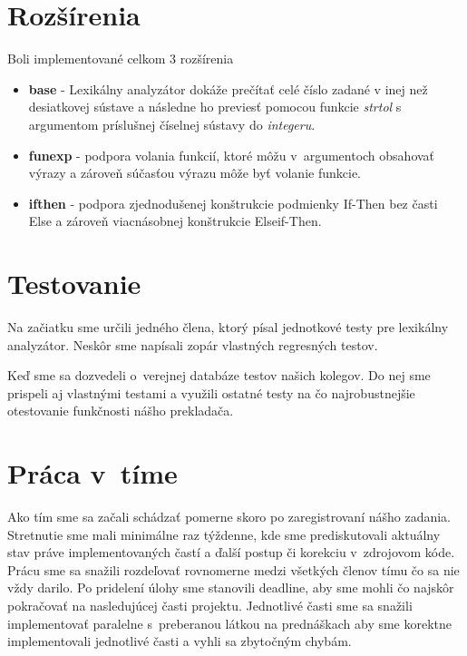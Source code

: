 \documentclass{article}
\begin{document}
    \section{Rozšírenia}
    Boli implementované celkom 3 rozšírenia
        \begin{itemize}
            \item \textbf{base}   - Lexikálny analyzátor dokáže prečítať celé číslo zadané v inej než
                                    desiatkovej sústave a následne ho previesť pomocou funkcie 
                                    \emph{strtol} s argumentom príslušnej číselnej sústavy do \emph{integeru}.
            \item \textbf{funexp} - podpora volania funkcií, ktoré môžu v~argumentoch obsahovať výrazy 
                                        a zároveň súčasťou výrazu môže byť volanie funkcie.
            \item  \textbf{ifthen} - podpora zjednodušenej konštrukcie podmienky If-Then bez časti Else
                                        a zároveň viacnásobnej konštrukcie Elseif-Then.
        \end{itemize}
    
    \section{Testovanie}
    Na začiatku sme určili jedného člena, ktorý písal jednotkové testy pre lexikálny analyzátor. 
    Neskôr sme napísali zopár vlastných regresných testov.
    
    Keď sme sa dozvedeli o~verejnej databáze testov našich kolegov. Do nej sme prispeli aj vlastnými testami a využili ostatné testy na čo najrobustnejšie otestovanie funkčnosti nášho prekladača.
    
    \section{Práca v~tíme}
    Ako tím sme sa začali schádzať pomerne skoro po zaregistrovaní nášho zadania. Stretnutie sme mali 
    minimálne raz týždenne, kde sme prediskutovali aktuálny stav práve implementovaných častí 
    a ďalší postup či korekciu v~zdrojovom kóde. Prácu sme sa snažili rozdeľovať rovnomerne medzi 
    všetkých členov tímu čo sa nie vždy darilo. Po pridelení úlohy sme stanovili deadline, aby sme 
    mohli čo najskôr pokračovať na nasledujúcej časti projektu. Jednotlivé časti sme sa snažili 
    implementovať paralelne s~preberanou látkou na prednáškach aby sme korektne implementovali
    jednotlivé časti a vyhli sa zbytočným chybám.
\end{document}
